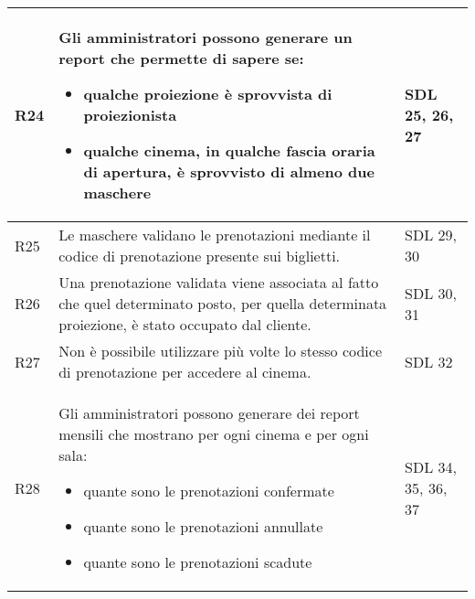 \begin{longtable}{|p{0.8cm}|p{13.4cm}|p{2.1cm}|}
      R24                                                                     &
      Gli amministratori possono generare un report che permette di sapere se:
      \begin{itemize}
            \item qualche proiezione è sprovvista di proiezionista
            \item qualche cinema, in qualche fascia oraria di apertura,
                  è sprovvisto di almeno due maschere
      \end{itemize}             &
      SDL 25, 26, 27
      \\\hline
      R25                                                                     &
      Le maschere validano le prenotazioni mediante il codice di prenotazione
      presente sui biglietti.                                                 &
      SDL 29, 30
      \\\hline
      R26                                                                     &
      Una prenotazione validata viene associata al fatto che quel determinato
      posto, per quella determinata proiezione, è stato occupato dal cliente. &
      SDL 30, 31
      \\\hline
      R27                                                                     &
      Non è possibile utilizzare più volte lo stesso codice di prenotazione
      per accedere al cinema.                                                 &
      SDL 32
      \\\hline
      R28                                                                     &
      Gli amministratori possono generare dei report mensili che mostrano
      per ogni cinema e per ogni sala:
      \begin{itemize}
            \item quante sono le prenotazioni confermate
            \item quante sono le prenotazioni annullate
            \item quante sono le prenotazioni scadute
      \end{itemize}                            &
      SDL 34, 35, 36, 37
      \\\hline
\end{longtable}

\pagebreak

